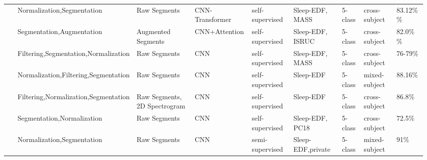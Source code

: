 \begin{table*}[ht]
\begin{tabular}{p{0.4cm}p{2.8cm}p{2cm}p{1.5cm}p{1.9cm}p{1.9cm}p{0.8cm}p{1.8cm}p{2cm}}
~\cite{Sleep54} & Normalization,\newline Segmentation & Raw Segments & CNN-Transformer & self-supervised & Sleep-EDF, \newline MASS & 5-class  & cross-subject & 83.12\%
\newline 84.23\% \\
~\cite{Sleep55} & Segmentation,\newline Augmentation & Augmented \newline Segments & CNN+Attention & self-supervised & Sleep-EDF, \newline ISRUC & 5-class  & cross-subject & 82.0\% \newline
79.9\% \\
~\cite{banville2019self} & Filtering,Segmentation,\newline Normalization & Raw Segments & CNN & self-supervised & Sleep-EDF, \newline MASS & 5-class & cross-subject & 76-79\% \\
~\cite{jiang2021self} & Normalization,Filtering,\newline Segmentation & Raw Segments & CNN & self-supervised & Sleep-EDF & 5-class  & mixed-subject & 88.16\% \\
~\cite{ko2022eeg} & Filtering,Normalization,\newline Segmentation & Raw Segments, \newline 2D Spectrogram & CNN & self-supervised & Sleep-EDF & 5-class  & cross-subject & 86.8\% \\
~\cite{Sleep63} & Segmentation,\newline Normalization & Raw Segments & CNN & self-supervised & Sleep-EDF, \newline PC18 & 5-class  & cross-subject & 72.5\% \\
~\cite{Sleep64} & Normalization,\newline Segmentation & Raw Segments & CNN & semi-supervised & Sleep-EDF,\newline private & 5-class & mixed-subject & 91\% \\

\end{tabular}
\end{table*}
